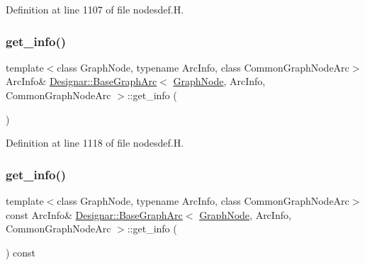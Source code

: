 Definition at line 1107 of file nodesdef.\+H.

\mbox{\label{class_designar_1_1_base_graph_arc_a90c613c982dec0d38acd6051c26a5562}} 
\subsubsection{\texorpdfstring{get\+\_\+info()}{get\_info()}\hspace{0.1cm}{\footnotesize\ttfamily [1/2]}}
{\footnotesize\ttfamily template$<$class Graph\+Node, typename Arc\+Info, class Common\+Graph\+Node\+Arc$>$ \\
Arc\+Info\& \hyperlink{class_designar_1_1_base_graph_arc}{Designar\+::\+Base\+Graph\+Arc}$<$ \hyperlink{class_designar_1_1_graph_node}{Graph\+Node}, Arc\+Info, Common\+Graph\+Node\+Arc $>$\+::get\+\_\+info (\begin{DoxyParamCaption}{ }\end{DoxyParamCaption})\hspace{0.3cm}{\ttfamily [inline]}}



Definition at line 1118 of file nodesdef.\+H.

\mbox{\label{class_designar_1_1_base_graph_arc_a90dce6365bbeef65a6ff5fa343b27710}} 
\subsubsection{\texorpdfstring{get\+\_\+info()}{get\_info()}\hspace{0.1cm}{\footnotesize\ttfamily [2/2]}}
{\footnotesize\ttfamily template$<$class Graph\+Node, typename Arc\+Info, class Common\+Graph\+Node\+Arc$>$ \\
const Arc\+Info\& \hyperlink{class_designar_1_1_base_graph_arc}{Designar\+::\+Base\+Graph\+Arc}$<$ \hyperlink{class_designar_1_1_graph_node}{Graph\+Node}, Arc\+Info, Common\+Graph\+Node\+Arc $>$\+::get\+\_\+info (\begin{DoxyParamCaption}{ }\end{DoxyParamCaption}) const\hspace{0.3cm}{\ttfamily [inline]}}



